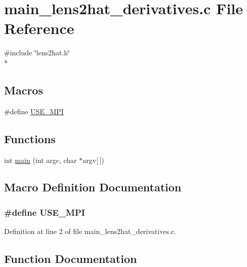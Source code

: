 \section{main\-\_\-lens2hat\-\_\-derivatives.\-c File Reference}
\label{main__lens2hat__derivatives_8c}
{\ttfamily \#include \char`\"{}lens2hat.\-h\char`\"{}}\\*
\subsection*{Macros}
\begin{DoxyCompactItemize}
\item 
\#define \hyperlink{main__lens2hat__derivatives_8c_a3869d282031f6ea6b50fdb980b758420}{U\-S\-E\-\_\-\-M\-P\-I}
\end{DoxyCompactItemize}
\subsection*{Functions}
\begin{DoxyCompactItemize}
\item 
int \hyperlink{main__lens2hat__derivatives_8c_a0ddf1224851353fc92bfbff6f499fa97}{main} (int argc, char $\ast$argv\mbox{[}$\,$\mbox{]})
\end{DoxyCompactItemize}


\subsection{Macro Definition Documentation}
\subsubsection[{U\-S\-E\-\_\-\-M\-P\-I}]{\setlength{\rightskip}{0pt plus 5cm}\#define U\-S\-E\-\_\-\-M\-P\-I}\label{main__lens2hat__derivatives_8c_a3869d282031f6ea6b50fdb980b758420}


Definition at line 2 of file main\-\_\-lens2hat\-\_\-derivatives.\-c.



\subsection{Function Documentation}
